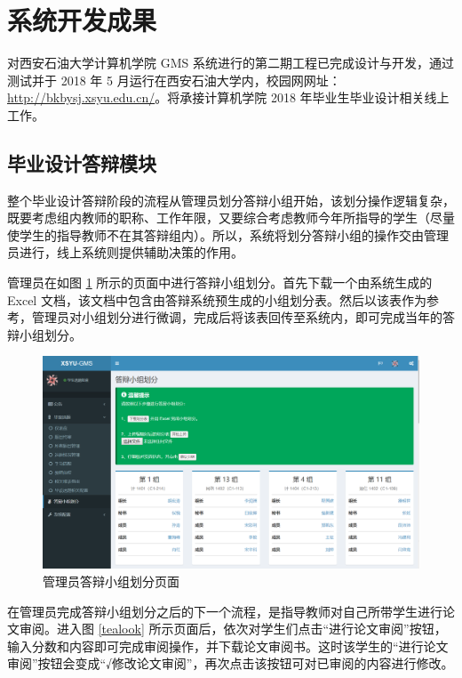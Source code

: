 \section{系统开发成果}

对西安石油大学计算机学院 GMS 系统进行的第二期工程已完成设计与开发，通过测试并于 2018 年 5 月运行在西安石油大学内，校园网网址：\underline{http://bkbysj.xsyu.edu.cn/}。将承接计算机学院 2018 年毕业生毕业设计相关线上工作。

\subsection{毕业设计答辩模块}

整个毕业设计答辩阶段的流程从管理员划分答辩小组开始，该划分操作逻辑复杂，既要考虑组内教师的职称、工作年限，又要综合考虑教师今年所指导的学生（尽量使学生的指导教师不在其答辩组内）。所以，系统将划分答辩小组的操作交由管理员进行，线上系统则提供辅助决策的作用。

管理员在如图 \ref{divide-show} 所示的页面中进行答辩小组划分。首先下载一个由系统生成的 Excel 文档，该文档中包含由答辩系统预生成的小组划分表。然后以该表作为参考，管理员对小组划分进行微调，完成后将该表回传至系统内，即可完成当年的答辩小组划分。

\begin{figure}
	\centering
	\includegraphics[width=1\linewidth]{figure/divide-show}
	\caption{管理员答辩小组划分页面}
	\label{divide-show}
\end{figure}

在管理员完成答辩小组划分之后的下一个流程，是指导教师对自己所带学生进行论文审阅。进入图 \ref{tealook} 所示页面后，依次对学生们点击“进行论文审阅”按钮，输入分数和内容即可完成审阅操作，并下载论文审阅书。这时该学生的“进行论文审阅”按钮会变成“√修改论文审阅”，再次点击该按钮可对已审阅的内容进行修改。

